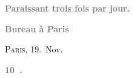 \pstart
           \begin{otherlanguage}{french}\textcolor{gray}{\textbf{\textbf{Paraissant trois fois par jour.}}}\end{otherlanguage}\pend
           
\pstart
           \begin{otherlanguage}{french}\textcolor{gray}{\textbf{\textbf{Bureau à Paris}}}\end{otherlanguage}\hfill \textsc{Paris}, 19. Nov.\pend
           
\pstart
           \begin{otherlanguage}{french}\textcolor{gray}{\textbf{\textbf{10 .}}}\end{otherlanguage}\pend
           
